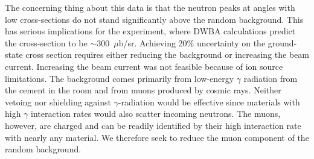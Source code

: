 The concerning thing about this data is that the neutron peaks at angles with low cross-sections do not stand significantly above the random background.  This has serious implications for the \GeTargets experiment, where DWBA calculations predict the cross-section to be $\sim$300~$\mu$b/sr.  Achieving 20\% uncertainty on the ground-state cross section requires either reducing the background or increasing the beam current.  Increasing the beam current was not feasible because of ion source limitations.  The background comes primarily from low-energy $\gamma$ radiation from the cement in the room and from muons produced by cosmic rays.  Neither vetoing nor shielding against $\gamma$-radiation would be effective since materials with high $\gamma$ interaction rates would also scatter incoming neutrons.  The muons, however, are charged and can be readily identified by their high interaction rate with nearly any material.  We therefore seek to reduce the muon component of the random background.

